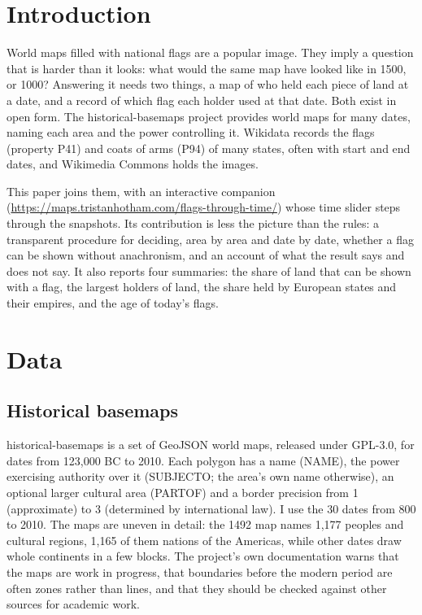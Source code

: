 \documentclass[11pt,a4paper]{article}
\begin{document}
\section{Introduction}
World maps filled with national flags are a popular image. They imply a question that is harder than it looks: what would the same map have looked like in 1500, or 1000? Answering it needs two things, a map of who held each piece of land at a date, and a record of which flag each holder used at that date. Both exist in open form. The historical-basemaps project \citep{ourednik} provides world maps for many dates, naming each area and the power controlling it. Wikidata \citep{wikidata} records the flags (property P41) and coats of arms (P94) of many states, often with start and end dates, and Wikimedia Commons holds the images.

This paper joins them, with an interactive companion (\url{https://maps.tristanhotham.com/flags-through-time/}) whose time slider steps through the snapshots. Its contribution is less the picture than the rules: a transparent procedure for deciding, area by area and date by date, whether a flag can be shown without anachronism, and an account of what the result says and does not say. It also reports four summaries: the share of land that can be shown with a flag, the largest holders of land, the share held by European states and their empires, and the age of today's flags.

\section{Data}
\subsection{Historical basemaps}
historical-basemaps \citep{ourednik} is a set of GeoJSON world maps, released under GPL-3.0, for dates from 123{,}000 BC to 2010. Each polygon has a name (NAME), the power exercising authority over it (SUBJECTO; the area's own name otherwise), an optional larger cultural area (PARTOF) and a border precision from 1 (approximate) to 3 (determined by international law). I use the 30 dates from 800 to 2010. The maps are uneven in detail: the 1492 map names 1,177 peoples and cultural regions, 1,165 of them nations of the Americas, while other dates draw whole continents in a few blocks. The project's own documentation warns that the maps are work in progress, that boundaries before the modern period are often zones rather than lines, and that they should be checked against other sources for academic work.
\end{document}
